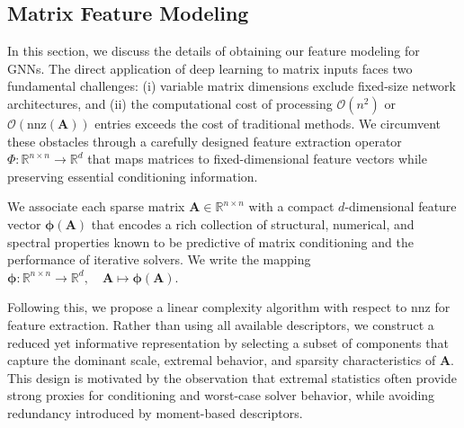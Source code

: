 \documentclass[11pt,a4paper]{article}
\theoremstyle{plain}
\theoremstyle{definition}
\theoremstyle{remark}
\begin{document}
\subsection{Matrix Feature Modeling}
In this section, we discuss the details of obtaining our feature modeling for GNNs. The direct application of deep learning to matrix inputs faces two fundamental challenges: (i) variable matrix dimensions exclude fixed-size network architectures, and (ii) the computational cost of processing $\mathcal{O}(n^2)$ or $\mathcal{O}(\text{nnz}(\mathbf{A}))$ entries exceeds the cost of traditional methods. We circumvent these obstacles through a carefully designed feature extraction operator $\Phi: \mathbb{R}^{n \times n} \to \mathbb{R}^d$ that maps matrices to fixed-dimensional feature vectors while preserving essential conditioning information.


We associate each sparse matrix $\mathbf{A} \in \mathbb{R}^{n \times n}$ with a compact $d$-dimensional feature vector $\bm{\phi}(\mathbf{A})$ that encodes a rich collection of structural, numerical, and spectral properties known to be predictive of matrix conditioning and the performance of iterative solvers. We write the mapping $\bm{\phi} : \mathbb{R}^{n \times n} \to \mathbb{R}^{d}, \quad
\mathbf{A} \mapsto \bm{\phi}(\mathbf{A})$.  

Following this, we propose a linear complexity algorithm with respect to $\mathrm{nnz}$ for feature extraction. 
Rather than using all available descriptors, we construct a reduced yet informative representation by selecting a subset of components that capture the dominant scale, extremal behavior, and sparsity characteristics of $\mathbf{A}$. 
This design is motivated by the observation that extremal statistics often provide strong proxies for conditioning and worst-case solver behavior, while avoiding redundancy introduced by moment-based descriptors.
\end{document}
